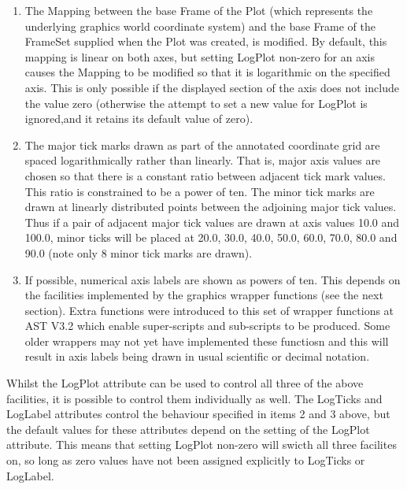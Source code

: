 \documentclass[twoside,11pt]{article}
\begin{document}
\begin{enumerate}

\item The Mapping between the base Frame of the Plot (which represents
the underlying graphics world coordinate system) and the base Frame of
the FrameSet supplied when the Plot was created, is modified. By
default, this mapping is linear on both axes, but setting LogPlot non-zero
for an axis causes the Mapping to be modified so that it is logarithmic
on the specified axis. This is only possible if the displayed section of
the axis does not include the value zero (otherwise the attempt to set
a new value for LogPlot is ignored,and it retains its default value of
zero).

\item The major tick marks drawn as part of the annotated coordinate grid
are spaced logarithmically rather than linearly. That is, major axis
values are chosen so that there is a constant ratio between adjacent
tick mark values. This ratio is constrained to be a power of ten. The
minor tick marks are drawn at linearly distributed points between the
adjoining major tick values. Thus if a pair of adjacent major tick values
are drawn at axis values 10.0 and 100.0, minor ticks will be placed at
20.0, 30.0, 40.0, 50.0, 60.0, 70.0, 80.0 and 90.0 (note only 8 minor tick
marks are drawn).

\item If possible, numerical axis labels are shown as powers of ten.
This depends on the facilities implemented by the graphics wrapper
functions (see the next section). Extra functions were introduced to this
set of wrapper functions at AST V3.2 which enable super-scripts and
sub-scripts to be produced. Some older wrappers may not yet have
implemented these functiosn and this will result in axis labels being
drawn in usual scientific or decimal notation.

\end{enumerate}

Whilst the LogPlot attribute can be used to control all three of the above
facilities, it is possible to control them individually as well. The
LogTicks and LogLabel attributes control the behaviour specified in items
2 and 3 above, but the default values for these attributes depend on the
setting of the LogPlot attribute. This means that setting LogPlot
non-zero will swicth all three facilites on, so long as zero values have
not been assigned explicitly to LogTicks or LogLabel.
\end{document}
